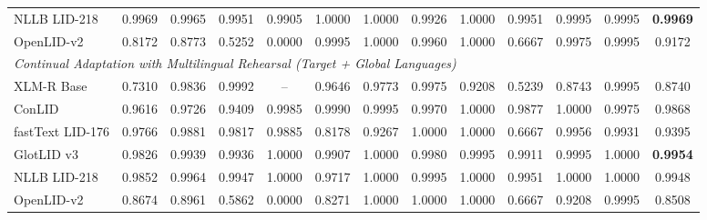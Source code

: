 \documentclass[11pt]{article}
\begin{document}
\begin{table}[p]
{\begin{tabular}{l ccc cccccccc c}
NLLB LID-218       & 0.9969 & 0.9965 & 0.9951 & 0.9905 & 1.0000 & 1.0000 & 0.9926 & 1.0000 & 0.9951 & 0.9995 & 0.9995 & \textbf{0.9969} \\
OpenLID-v2         & 0.8172 & 0.8773 & 0.5252 & 0.0000 & 0.9995 & 1.0000 & 0.9960 & 1.0000 & 0.6667 & 0.9975 & 0.9995 & 0.9172 \\
\midrule
\multicolumn{13}{l}{\textit{Continual Adaptation with Multilingual Rehearsal (Target + Global Languages)}} \\
XLM-R Base         & 0.7310 & 0.9836 & 0.9992 & -- & 0.9646 & 0.9773 & 0.9975 & 0.9208 & 0.5239 & 0.8743 & 0.9995 & 0.8740 \\
ConLID             & 0.9616 & 0.9726 & 0.9409 & 0.9985 & 0.9990 & 0.9995 & 0.9970 & 1.0000 & 0.9877 & 1.0000 & 0.9975 & 0.9868 \\
fastText LID-176   & 0.9766 & 0.9881 & 0.9817 & 0.9885 & 0.8178 & 0.9267 & 1.0000 & 1.0000 & 0.6667 & 0.9956 & 0.9931 & 0.9395 \\
GlotLID v3         & 0.9826 & 0.9939 & 0.9936 & 1.0000 & 0.9907 & 1.0000 & 0.9980 & 0.9995 & 0.9911 & 0.9995 & 1.0000 & \textbf{0.9954} \\
NLLB LID-218       & 0.9852 & 0.9964 & 0.9947 & 1.0000 & 0.9717 & 1.0000 & 0.9995 & 1.0000 & 0.9951 & 1.0000 & 1.0000 & 0.9948 \\
OpenLID-v2         & 0.8674 & 0.8961 & 0.5862 & 0.0000 & 0.8271 & 1.0000 & 1.0000 & 1.0000 & 0.6667 & 0.9208 & 0.9995 & 0.8508 \\
\bottomrule
\end{tabular}%
}
\end{table}
\end{document}
